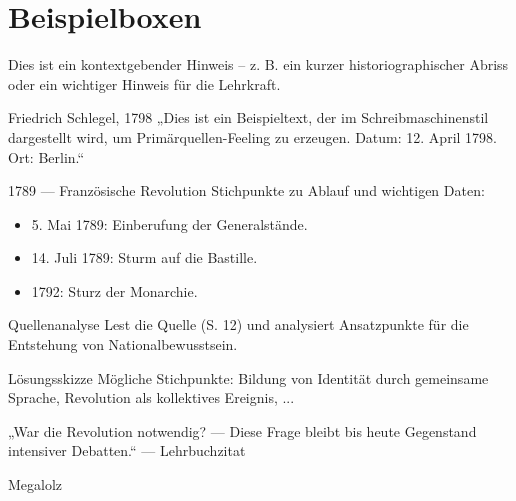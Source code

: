 \documentclass[11pt,a4paper,oneside]{article}
\begin{document}
	\newpage
	
	\section{Beispielboxen}
	
	\begin{histnote}
		Dies ist ein kontextgebender Hinweis – z. B. ein kurzer historiographischer Abriss oder ein wichtiger Hinweis für die Lehrkraft.
	\end{histnote}

	
	\begin{primarysource}{Friedrich Schlegel, 1798}
		„Dies ist ein Beispieltext, der im Schreibmaschinenstil dargestellt wird, um Primärquellen-Feeling zu erzeugen.
		Datum: 12. April 1798. Ort: Berlin.“
	\end{primarysource}
	
	\begin{timeline}{1789 — Französische Revolution}
		Stichpunkte zu Ablauf und wichtigen Daten:
		\begin{itemize}
			\item 5. Mai 1789: Einberufung der Generalstände.
			\item 14. Juli 1789: Sturm auf die Bastille.
			\item 1792: Sturz der Monarchie.
		\end{itemize}
	\end{timeline}
	
	\begin{histaufgabe}{Quellenanalyse}
		Lest die Quelle (S. 12) und analysiert Ansatzpunkte für die Entstehung von Nationalbewusstsein.
	\end{histaufgabe}
	
	\begin{histloesung}{Lösungsskizze}
		Mögliche Stichpunkte: Bildung von Identität durch gemeinsame Sprache, Revolution als kollektives Ereignis, ...
	\end{histloesung}
	
	\begin{quoteBox}
		„War die Revolution notwendig? — Diese Frage bleibt bis heute Gegenstand intensiver Debatten.“ — Lehrbuchzitat
	\end{quoteBox}
	
	Megalolz
	
\end{document}
